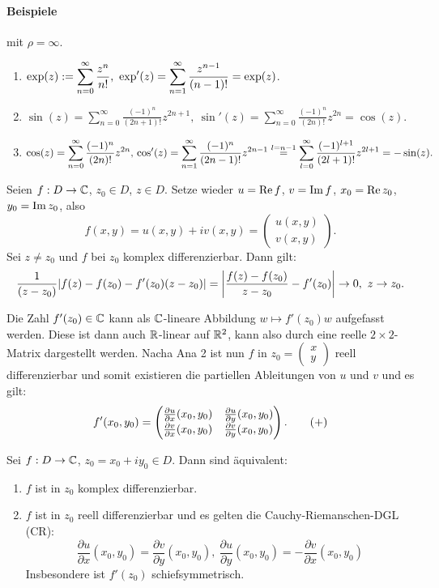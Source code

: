 \documentclass[a4paper,twoside,DIV15,BCOR12mm]{scrbook}
\renewcommand{\Re}[1]{\ensuremath\operatorname{Re}{#1}}
\renewcommand{\Im}[1]{\ensuremath\operatorname{Im}{#1}}
\newcommand{\C}{\set{C}} %
\newcommand{\R}{\set{R}}
\newcommand{\cmplx}[2]{\left(\!\!\!\begin{array}{c}#1\\#2\end{array}\!\!\!\right)}
\begin{document}
\paragraph{Beispiele} mit $\rho = \infty$.\begin{enumerate}
\item $\displaystyle \exp(z) := \sum_{n=0}^\infty \frac{z^n}{n!},\ \exp'(z) = \sum_{n=1}^\infty \frac{z^{n-1}}{(n-1)!} = \exp(z)$.
\item $\displaystyle \sin(z) = \sum_{n=0}^\infty \frac{(-1)^n}{(2n+1)!}z^{2n+1},\ \sin'(z) = \sum_{n=0}^\infty \frac{(-1)^n}{(2n)!}z^{2n} = \cos(z).$
\item $\displaystyle \cos(z) = \sum_{n=0}^\infty \frac{(-1)^n}{(2n)!}z^{2n},\newline \cos'(z) = \sum_{n=1}^\infty \frac{(-1)^n}{(2n-1)!}z^{2n-1} \stackrel{l=n-1}{=} \sum_{l=0}^\infty \frac{(-1)^{l+1}}{(2l+1)!}z^{2l+1} = -\sin(z).$
\end{enumerate}


Seien $f:D\ra\C$, $z_0\in D$, $z\in D$. Setze wieder $u = \Re f$, $v = \Im f$, $x_0 = \Re z_0$, $y_0 = \Im z_0$, also
\[f(x,y) = u(x,y) + iv(x,y) = \cmplx{u(x,y)}{v(x,y)}.\]
Sei $z\neq z_0$ und $f$ bei $z_0$ komplex differenzierbar. Dann gilt:
\[\frac{1}{(z-z_0)}|f(z)-f(z_0)-f'(z_0)(z-z_0)| = \left|\frac{f(z)-f(z_0)}{z-z_0} - f'(z_0)\right| \rightarrow 0,\ z\rightarrow z_0.\]

Die Zahl $f'(z_0)\in\mathbb{C}$ kann als $\C$-lineare Abbildung $w\mapsto f'(z_0)w$ aufgefasst werden. Diese ist dann auch $\R$-linear auf $\R^2$, kann also durch eine reelle $2\times 2$-Matrix dargestellt werden. Nacha Ana 2 ist nun $f$ in $z_0 = \cmplx{x}{y}$ reell differenzierbar und somit existieren die partiellen Ableitungen von $u$ und $v$ und es gilt:
\[f'(x_0,y_0) = \left(\!\!\!\begin{array}{c c}\frac{\partial u}{\partial x} (x_0,y_0) & \frac{\partial u}{\partial y} (x_0,y_0)\\
\frac{\partial v}{\partial x} (x_0,y_0) & \frac{\partial v}{\partial y} (x_0,y_0)\end{array}\!\!\!\right).\tag{+}\]

\begin{satz} Sei $f:D\ra\C$, $z_0 = x_0 + iy_0\in D$. Dann sind äquivalent:
\begin{enumerate}
\item $f$ ist in $z_0$ komplex differenzierbar.
\item $f$ ist in $z_0$ reell differenzierbar und es gelten die Cauchy-Riemanschen-DGL (CR):
\[\frac{\partial u}{\partial x} (x_0,y_0) = \frac{\partial v}{\partial y} (x_0,y_0),\ \frac{\partial u}{\partial y} (x_0,y_0) = -\frac{\partial v}{\partial x} (x_0,y_0)\]
Insbesondere ist $f'(z_0)$ schiefsymmetrisch.
\end{enumerate}
\end{satz}
\end{document}
